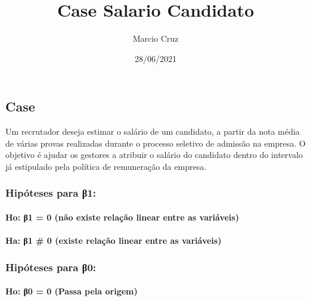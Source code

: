\documentclass[
]{article}
\title{Case Salario Candidato}
\author{Marcio Cruz}
\date{28/06/2021}
\begin{document}
\maketitle

\hypertarget{case}{%
\subsection{Case}\label{case}}

Um recrutador deseja estimar o salário de um candidato, a partir da nota
média de várias provas realizadas durante o processo seletivo de
admissão na empresa. O objetivo é ajudar os gestores a atribuir o
salário do candidato dentro do intervalo já estipulado pela política de
remuneração da empresa.

\hypertarget{hipuxf3teses-para-ux3b21}{%
\subsubsection{Hipóteses para β1:}\label{hipuxf3teses-para-ux3b21}}

\hypertarget{ho-ux3b21-0-nuxe3o-existe-relauxe7uxe3o-linear-entre-as-variuxe1veis}{%
\paragraph{Ho: β1 = 0 (não existe relação linear entre as
variáveis)}\label{ho-ux3b21-0-nuxe3o-existe-relauxe7uxe3o-linear-entre-as-variuxe1veis}}

\hypertarget{ha-ux3b21-0-existe-relauxe7uxe3o-linear-entre-as-variuxe1veis}{%
\paragraph{Ha: β1 \# 0 (existe relação linear entre as
variáveis)}\label{ha-ux3b21-0-existe-relauxe7uxe3o-linear-entre-as-variuxe1veis}}

\hypertarget{hipuxf3teses-para-ux3b20}{%
\subsubsection{Hipóteses para β0:}\label{hipuxf3teses-para-ux3b20}}

\hypertarget{ho-ux3b20-0-passa-pela-origem}{%
\paragraph{Ho: β0 = 0 (Passa pela
origem)}\label{ho-ux3b20-0-passa-pela-origem}}
\end{document}
